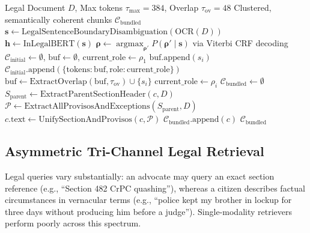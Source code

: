 \documentclass[conference]{IEEEtran}
\begin{document}
\begin{algorithm}[!t]
\caption{Proviso-Aware Rhetorical Chunking and Bundling}
\label{alg:chunking}
\begin{algorithmic}[1]
\Require Legal Document $D$, Max tokens $\tau_{\max}=384$, Overlap $\tau_{\text{ov}}=48$
\Ensure Clustered, semantically coherent chunks $\mathcal{C}_{\text{bundled}}$
\State $\mathbf{s} \gets \text{LegalSentenceBoundaryDisambiguation}(\text{OCR}(D))$
\State $\mathbf{h} \gets \text{InLegalBERT}(\mathbf{s})$
\State $\mathbf{\rho} \gets \operatorname{argmax}_{\mathbf{\rho}'} P(\mathbf{\rho}' \mid \mathbf{s})$ via Viterbi CRF decoding
\State $\mathcal{C}_{\text{initial}} \gets \emptyset$, $\text{buf} \gets \emptyset$, $\text{current\_role} \gets \rho_1$
        \State $\text{buf}.\text{append}(s_i)$
    \Else
        \State $\mathcal{C}_{\text{initial}}.\text{append}(\{\text{tokens}: \text{buf}, \text{role}: \text{current\_role}\})$
        \State $\text{buf} \gets \text{ExtractOverlap}(\text{buf}, \tau_{\text{ov}}) \cup \{s_i\}$
        \State $\text{current\_role} \gets \rho_i$
    \EndIf
\EndFor
\State $\mathcal{C}_{\text{bundled}} \gets \emptyset$
        \State $S_{\text{parent}} \gets \text{ExtractParentSectionHeader}(c, D)$
        \State $\mathcal{P} \gets \text{ExtractAllProvisosAndExceptions}(S_{\text{parent}}, D)$
        \State $c.\text{text} \gets \text{UnifySectionAndProvisos}(c, \mathcal{P})$
    \EndIf
    \State $\mathcal{C}_{\text{bundled}}.\text{append}(c)$
\EndFor
\State \Return $\mathcal{C}_{\text{bundled}}$
\end{algorithmic}
\end{algorithm}

\subsection{Asymmetric Tri-Channel Legal Retrieval}
Legal queries vary substantially: an advocate may query an exact section reference (e.g., ``Section 482 CrPC quashing''), whereas a citizen describes factual circumstances in vernacular terms (e.g., ``police kept my brother in lockup for three days without producing him before a judge''). Single-modality retrievers perform poorly across this spectrum.
\end{document}

